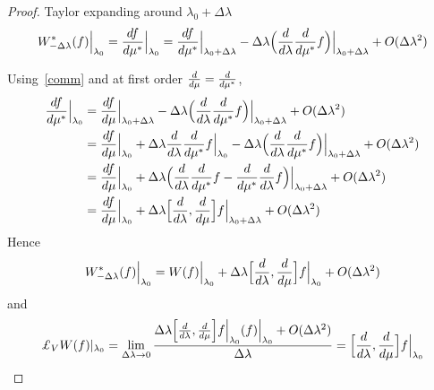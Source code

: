     \begin{proof}
        Taylor expanding around $\lambda_0 + \Delta \lambda$ 
        \begin{equation*}
            W^*_{-\Delta\lambda} (f) \Big \vert_{\lambda_0} = \frac{df}{d\mu^*} \Big \vert_{\lambda_0} = \frac{df}{d\mu^*} \Big \vert_{\lambda_0 + \Delta \lambda} - \Delta \lambda \Big ( \frac{d}{d\lambda} \frac{d}{d\mu^*} f \Big)\Big \vert_{\lambda_0 + \Delta \lambda} + O(\Delta \lambda^2)
        \end{equation*}
        
        Using~\eqref{comm} and at first order $\frac{d}{d\mu} = \frac{d}{d\mu^*}$,
        \begin{equation*}
        \begin{aligned}
            \frac{df}{d\mu^*} \Big \vert_{\lambda_0} & = \frac{df}{d\mu} \Big \vert_{\lambda_0 + \Delta \lambda} - \Delta \lambda \Big ( \frac{d}{d\lambda} \frac{d}{d\mu^*} f \Big)\Big \vert_{\lambda_0 + \Delta \lambda} + O(\Delta \lambda^2) \\ & = \frac{df}{d\mu} \Big \vert_{\lambda_0} + \Delta \lambda \frac{d}{d\lambda} \frac{d}{d\mu^*} f \Big \vert_{\lambda_0} - \Delta \lambda \Big ( \frac{d}{d\lambda} \frac{d}{d\mu^*} f \Big)\Big \vert_{\lambda_0 + \Delta \lambda} + O(\Delta \lambda^2) \\ & = \frac{df}{d\mu} \Big \vert_{\lambda_0} + \Delta \lambda \Big (\frac{d}{d\lambda} \frac{d}{d\mu^*} f -  \frac{d}{d\mu^*} \frac{d}{d\lambda} f \Big) \Big \vert_{\lambda_0 + \Delta \lambda} + O(\Delta \lambda^2) \\ & = \frac{df}{d\mu} \Big \vert_{\lambda_0} + \Delta \lambda \Big [\frac{d}{d\lambda}, \frac{d}{d\mu} \Big ] f \Big \vert_{\lambda_0 + \Delta \lambda} + O(\Delta \lambda^2)  
        \end{aligned}
        \end{equation*}
        Hence
        \begin{equation*}
            W^*_{-\Delta\lambda} (f) \Big \vert_{\lambda_0} = W(f) \Big \vert_{\lambda_0} + \Delta \lambda \Big [\frac{d}{d\lambda}, \frac{d}{d\mu} \Big ] f \Big \vert_{\lambda_0} + O(\Delta \lambda^2) 
        \end{equation*}
        and 
        \begin{equation*}
            \pounds_V W(f) \vert_{\lambda_0} = \lim_{\Delta \lambda \rightarrow 0} \frac{\Delta \lambda \Big [\dv{}{\lambda}, \dv{}{\mu} \Big ] f \Big \vert_{\lambda_0} (f) \Big \vert_{\lambda_0} + O(\Delta \lambda^2) }{\Delta \lambda} = \Big [\dv{}{\lambda}, \dv{}{\mu} \Big ] f \Big \vert_{\lambda_0}
        \end{equation*}
    \end{proof}

